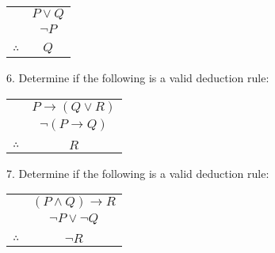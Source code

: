 \documentclass[10pt,]{book}
\theoremstyle{plain}
\theoremstyle{definition}
\theoremstyle{definition}
\theoremstyle{definition}
\numberwithin{equation}{chapter}
\newcommand{\hrulethin}  {\noalign{\hrule height 0.04em}}
\def\imp{\rightarrow}
\begin{document}
\begin{exerciselist}
\begin{table}
\centering
\begin{tabular}{cc}
&\(P \vee Q\)\tabularnewline[0pt]
&\(\neg P\)\tabularnewline[0pt]
&\tabularnewline\hrulethin
\(\therefore\)&\(Q\)
\end{tabular}
\end{table}
\par\smallskip
\item[6.]\hypertarget{exercise-225}{}
              Determine if the following is a valid deduction rule:
\leavevmode%
\begin{table}
\centering
\begin{tabular}{cc}
&\(P \imp (Q \vee R)\)\tabularnewline[0pt]
&\(\neg(P \imp Q)\)\tabularnewline[0pt]
&\tabularnewline\hrulethin
\(\therefore\)&\(R\)
\end{tabular}
\end{table}
\par\smallskip
\item[7.]\hypertarget{exercise-226}{}
              Determine if the following is a valid deduction rule:
\leavevmode%
\begin{table}
\centering
\begin{tabular}{cc}
&\((P \wedge Q) \imp R\)\tabularnewline[0pt]
&\(\neg P \vee \neg Q\)\tabularnewline[0pt]
&\tabularnewline\hrulethin
\(\therefore\)&\(\neg R\)
\end{tabular}
\end{table}
\par\smallskip
\end{exerciselist}
\typeout{************************************************}
\typeout{************************************************}
\end{document}
